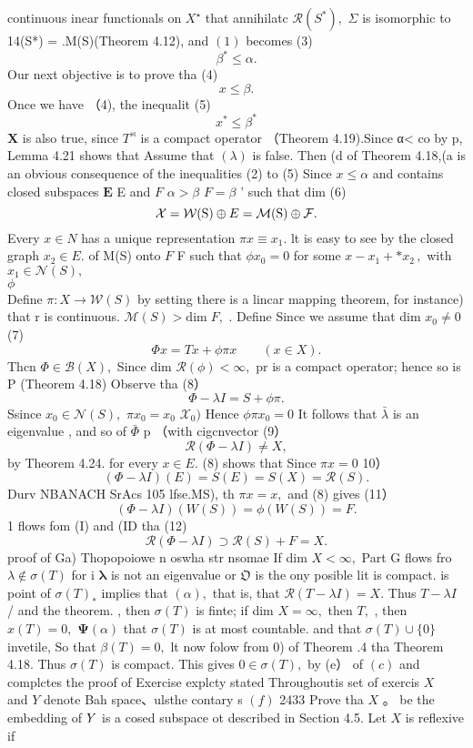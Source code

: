 continuous inear functionals on $X^{\star}$ that annihilatc ${\mathcal{R}}(S^{*}),$ $\Sigma$ is isomorphic to 14(S*) = .M(S)(Theorem 4.12), and $\operatorname{\mathcal{(1)}}$ becomes (3) $$ \beta^{*}\leq\alpha. $$ Our next objective is to prove tha (4) $$ x\leq\beta. $$ Once we have （4), the inequalit (5) $$ x^{*}\leq\beta^{*} $$ ${\boldsymbol{X}}$ is also true, since $T^{\rtimes}$ is a compact operator （Theorem 4.19).Since α< co by p, Lemma 4.21 shows that Assume that $(\lambda)$ is false. Then (d of Theorem 4.18,(a is an obvious consequence of the inequalities (2) to (5) Since $x\leqslant\alpha$ and contains closed subspaces $\boldsymbol{E}$ E and ${\mathbf{}}F$ $\alpha>\beta$ $F=\beta$ ' such that dim (6) $$ {\cal X}={\mathcal{W}}(\mathrm{S})\oplus E={\mathcal{M}}(\mathrm{S})\oplus{\cal F}. $$ Every $x\in N$ has a unique representation $\pi x\equiv x_{1}.$ lt is easy to see by the closed graph $x_{2}\in E.$ of M(S) onto ${\mathbf{}}F$ F such that $\phi x_{0}=0$ for some $x-x_{1}+*x_{2}\,,$ with $x_{1}\in{\mathcal{N}}(S),$ $\phi~~~~~~~~~~~~~~~~~~~~~~~~~~~~~~~~~~~~~~~~~~~~~~~~~~~~~~~~~~~~~~~~~~~~~~~~~~~~~~~~~~~~~~~~~~~~~~~~~~~~~~~~~~~~~~~~~~~~~~~~~~~~~~~~~~~~~~~~~~~~~~~~~~~~~~~~~~~~~~~~~~~~~~~~~~~~~~~~~~~~~~~~~~~~~~~~~~~~~~~~~~~~~~~~$ Define $\pi\colon X\to{\mathcal{W}}(S)$ by setting there is a lincar mapping theorem, for instance) that r is continuous. $\mathcal{M}(S)>\mathrm{dim}\;F,$ . Define Since we assume that dim $x_{0}\neq0$ (7) $$ \Phi x=T x+\phi\pi x\qquad(x\in X). $$ Thcn $\Phi\in{\mathcal{B}}(X),$ Since dim ${\mathcal R}(\phi)<\infty,$ pr is a compact operator; hence so is P (Theorem 4.18) Observe tha (8） $$ \Phi-\lambda I=S+\phi\pi. $$ Ssince $x_{0}\in{\mathcal{N}}(S),$ $\pi x_{0}=x_{0}$ $\textstyle{\mathcal{X}}_{0})$ Hence $\phi\pi x_{0}=0$ It follows that $\bar{\lambda}$ is an eigenvalue , and so of $\bar{\Phi}$ p （with cigcnvector (9） $$ {\mathcal{R}}(\Phi-\lambda I)\neq X, $$ by Theorem 4.24. for every $x\in E.$ (8) shows that Since $\pi x=0$ 10） $$ (\Phi-\lambda I)(E)=S(E)=S(X)={\mathcal{R}}(S). $$Durv NBANACH SrAcs 105 lfse.MS), th $\pi x=x,$ and (8) gives (11） $$ (\Phi-\lambda I)(W(S))=\phi(W(S))=F. $$ 1 flows fom (I) and (ID tha (12) $$ {\mathcal{R}}(\Phi-\lambda I)\supset{\mathcal{R}}(S)+F=X. $$ proof of Ga) Thopopoiowe n oswha str nsomae If dim $X<\infty,$ Part G flows fro $\lambda\notin\sigma(T)$ for i $\boldsymbol{\lambda}$ is not an eigenvalue or ${\mathfrak{O}}$ is the ony posible lit is compact. is point of $\sigma(T)_{*}$ implies that $(\alpha),$ that is, that ${\mathcal{R}}(T-\lambda I)=X.$ Thus $T-\lambda I$ / and the theorem. , then $\sigma(T)$ is finte; if dim $X=\infty,$ then $T,$ , then $x(T)=0,$ $\mathbf{\Psi}(\alpha)$ that $\sigma(T)$ is at most countable. and that $\sigma(T)\cup\{0\}$ invetile, So that $\beta(T)=0,$ lt now folow from 0) of Theorem .4 tha Theorem 4.18. Thus $\sigma(T)$ is compact. This gives $0\in\sigma(T),$ by (e） of $\left(c\right)$ and complctes the proof of Exercise explcty stated Throughoutis set of exercis $\textstyle X{\mathrm{~}}\quad$ and ${\mathbf{}}Y$ denote Bah space、ulsthe contary s $\left(f\right)$ 2433 Prove tha $\textstyle X$ 。 be the embedding of ${\bf{}}Y$ is a cosed subspace ot described in Section 4.5. Let $\textstyle X$ is reflexive if 